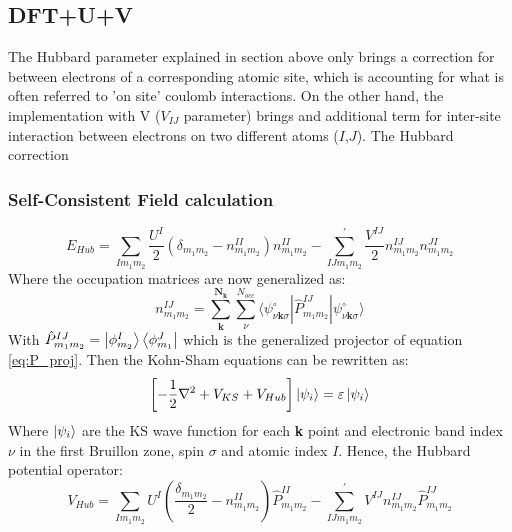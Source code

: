 \subsection{DFT+U+V}
The Hubbard parameter explained in section above only brings a correction for between electrons of a corresponding atomic site, which is accounting for what is often referred to 'on site' coulomb interactions. On the other hand, the implementation with V ($V_{I J}$ parameter) brings and additional term for inter-site interaction between electrons on two different atoms ($I$,$J$). The Hubbard correction
\subsubsection{Self-Consistent Field calculation}

\begin{equation}
E_{Hub} = 
\sum_{I m_1 m_2} \frac{U^I}{2}
\left( 
    \delta_{m_1 m_2} - n_{m_1 m_2}^{II}
\right)
n_{m_1 m_2}^{II}
-
\sum_{I J m_1 m_2}^{'} \frac{V^{I J}}{2}
n_{m_1 m_2}^{I J} n_{m_1 m_2}^{J I}
\label{eq:E_Hub_corr}
\end{equation}
Where the occupation matrices are now generalized as:
\begin{equation}
n_{m_1 m_2}^{I J} = 
\sum_\mathbf{k}^\mathbf{N_k}
\sum_\nu^{N_{occ}}
\langle 
    \psi^{\circ}_{\nu\mathbf{k}\sigma}
    \left| 
        \hat{P}^{I J}_{m_1 m_2}
    \right|
    \psi^{\circ}_{\nu\mathbf{k}\sigma}
\rangle
\label{eq:n^IJ_m1_m2}
\end{equation}
With $\hat{P}^{I J}_{m_1 m_2}  = \ket{\phi^I_{m_2}}\bra{\phi^J_{m_1}}$ which is the generalized projector of equation \ref{eq:P_proj}. Then the Kohn-Sham equations can be rewritten as:
\begin{equation}
\left [
-\frac{1}{2}\nabla^2 + V_{KS} + V_{Hub}
\right]
\ket{\psi_i} 
= \varepsilon \ket{\psi_i} 
\label{eq:KSDFT+U+V}
\end{equation}
Where $\ket{\psi_i}$ are the KS wave function for each \textbf{k} point and electronic band index $\nu$ in the first Bruillon zone, spin $\sigma$ and atomic index $I$. Hence, the Hubbard potential operator:
\begin{equation}
V_{Hub} = 
\sum_{I m_1 m_2}
U^I
\left( 
\frac{\delta_{m_1 m_2}}{2} - n_{m_1 m_2}^{II}
\right)
\hat{P}^{I I}_{m_1 m_2}
-
\sum_{I J m_1 m_2}^{'} 
V^{I J}
n_{m_1 m_2}^{I J} 
\hat{P}^{I J}_{m_1 m_2}
\label{eq:V_hubb}
\end{equation}


